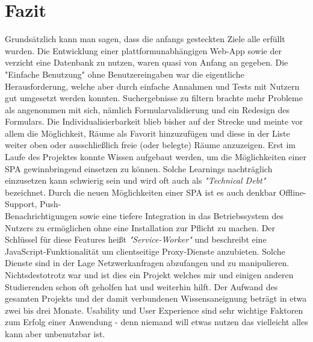 \section{Fazit}

Grundsätzlich kann man sagen, dass die anfangs gesteckten Ziele alle erfüllt wurden.
Die Entwicklung einer plattformunabhängigen Web-App sowie der verzicht eine Datenbank zu nutzen,
waren quasi von Anfang an gegeben. Die "Einfache Benutzung" ohne Benutzereingaben war
die eigentliche Herausforderung, welche aber durch einfache Annahmen und Tests mit Nutzern
gut umgesetzt werden konnten. Suchergebnisse zu filtern brachte mehr Probleme als
angenommen mit sich, nämlich Formularvalidierung und ein Redesign des Formulars.
Die Individualisierbarkeit blieb bisher auf der Strecke und meinte vor allem die Möglichkeit,
Räume als Favorit hinzuzufügen und diese in der Liste weiter oben oder ausschließlich
freie (oder belegte) Räume anzuzeigen. Erst im Laufe des Projektes konnte Wissen aufgebaut werden,
um die Möglichkeiten einer \ac{SPA} gewinnbringend einsetzen zu können.
Solche Learnings nachträglich einzusetzen kann schwierig sein
und wird oft auch als \textit{"Technical Debt"} bezeichnet.
Durch die neuen Möglichkeiten einer SPA ist es auch denkbar Offline-Support,
Push-\\Benachrichtigungen sowie eine tiefere Integration in das Betriebssystem des Nutzers
zu ermöglichen ohne eine Installation zur Pflicht zu machen. Der Schlüssel für
diese Features heißt \textit{"Service-Worker"} und beschreibt eine JavaScript-Funktionalität
um clientseitige Proxy-Dienste anzubieten. Solche Dienste sind in der Lage Netzwerkanfragen
abzufangen und zu manipulieren. Nichtsdestotrotz war und ist dies ein Projekt welches mir
und einigen anderen Studierenden schon oft geholfen hat und weiterhin hilft.
Der Aufwand des gesamten Projekts und der damit verbundenen Wissensaneignung
beträgt in etwa zwei bis drei Monate.
Usability und User Experience sind sehr wichtige Faktoren zum Erfolg
einer Anwendung - denn niemand will etwas nutzen das vielleicht alles kann aber unbenutzbar ist.
